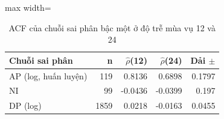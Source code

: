 \begin{table}[H]
\centering\footnotesize
\caption{ACF của chuỗi sai phân bậc một ở độ trễ mùa vụ 12 và 24}\label{tab:tab_b12_10_seasonal_lags}
\begin{adjustbox}{max width=\linewidth}
\begin{tabular}{|l|r|r|r|r|}
\toprule
Chuỗi sai phân & n & $\hat{\rho}$(12) & $\hat{\rho}$(24) & Dải $\pm$ \\
\midrule
AP (log, huấn luyện) & 119 & 0.8136 & 0.6898 & 0.1797 \\
NI & 99 & -0.0436 & -0.0399 & 0.197 \\
DP (log) & 1859 & 0.0218 & -0.0163 & 0.0455 \\
\bottomrule
\end{tabular}
\end{adjustbox}
\end{table}
